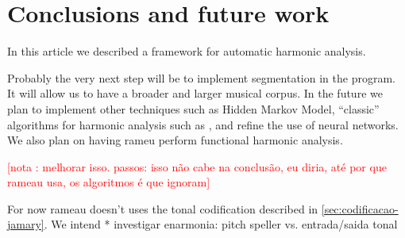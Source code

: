 \documentclass{article}
\newcounter{notacounter}
\newcommand{\nota}[1]{
  \addtocounter{notacounter}{1}
  \textcolor{red}{[nota \arabic{notacounter}: #1]}
}
\begin{document}
\section{Conclusions and future work}
\label{sec:concl-future-work}

In this article we described a framework for automatic harmonic
analysis.

Probably the very next step will be to implement segmentation in the
program. It will allow us to have a broader and larger musical corpus.
In the future we plan to implement other techniques such as Hidden
Markov Model, ``classic'' algorithms for harmonic analysis such as
\cite{ulrich:analysis,maxwell:expert}, and refine the use of neural
networks. We also plan on having rameu perform functional harmonic
analysis.

\nota{melhorar isso. passos: isso não cabe na conclusão, eu diria, até
por que rameau usa, os algoritmos é que ignoram}
For now rameau doesn't uses the tonal codification described
in \ref{sec:codificacao-jamary}. We intend 
* investigar enarmonia: pitch speller vs. entrada/saida tonal



\end{document}
